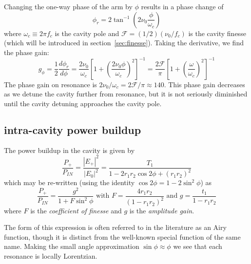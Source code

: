 Changing the one-way phase of the arm by $\phi$ results in a phase 
change of
\begin{equation}
\phi_r   = 2 \tan^{-1} \left( 2 \nu_0 \frac{\phi}{\omega_c} \right)
\end{equation}
where $\omega_c\equiv2\pi f_c$ is the cavity pole and $\mathcal{F}=(1/2)(\nu_0/f_c)$ is the cavity finesse (which will be introduced in section~\ref{sec:finesse}).  Taking the derivative, we find the phase gain:
\begin{equation}
g_\phi =  \frac{1}{2} \frac{d \phi_r}{d \phi} 
= \frac{2 \nu_0}{\omega_c} \left[1 + \left(\frac{2 \nu_0 \phi}{\omega_c}\right)^2 \right]^{-1} 
= \frac{2 \mathcal{F}}{\pi} \left[1 + \left(\frac{\omega}{\omega_c}\right)^2 \right]^{-1} 
\end{equation}
The phase gain on resonance is $2 \nu_0 / \omega_c = 2\mathcal{F}/\pi \approx 140$. This phase gain decreases as we detune the cavity further from resonance, but it is not seriously diminished until the cavity detuning approaches the cavity pole.

\subsection{intra-cavity power buildup}

The power buildup in the cavity is given by 
\begin{equation}
\frac{P_+}{P_{IN}} = \frac{|E_+|^2}{|E_0|^2} = \frac{ T_1}{1 - 2 r_1 r_2 \cos 2\phi+\left(r_1 r_2\right)^2 }
\end{equation} 
which may be re-written (using the identity $\cos2\phi = 1 -
2\sin^2\phi$) as
\begin{equation}
\label{cavity_buildup_eq}
\frac{P_+}{P_{IN}} = \frac{g^2}{1 + F \sin^2 \phi} 
\text{  with  } F = \frac{4 r_1 r_2}{(1 - r_1 r_2)^2}
\text{  and  } g = \frac{t_1}{1-r_1 r_2}
\end{equation} 
where $F$ is the \emph{coefficient of finesse} and $g$ is the
\emph{amplitude gain}.

The form of this expression is often referred to in the literature as
an Airy function, though it is distinct from the well-known special
function of the same name.  Making the small angle approximation
$\sin\phi\approx\phi$ we see that each resonance is locally Lorentzian.

